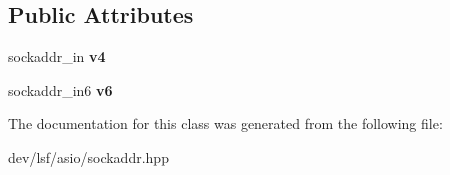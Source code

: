 \subsection*{Public Attributes}
\begin{DoxyCompactItemize}
\item 
\hypertarget{classlsf_1_1asio_1_1SockAddr_a4f9ff7f1fef58080776f0ea6a0032542}{
sockaddr\_\-in {\bfseries v4}}
\label{classlsf_1_1asio_1_1SockAddr_a4f9ff7f1fef58080776f0ea6a0032542}

\item 
\hypertarget{classlsf_1_1asio_1_1SockAddr_a3ee4827e60b045c116cba3b59f3944ec}{
sockaddr\_\-in6 {\bfseries v6}}
\label{classlsf_1_1asio_1_1SockAddr_a3ee4827e60b045c116cba3b59f3944ec}

\end{DoxyCompactItemize}


The documentation for this class was generated from the following file:\begin{DoxyCompactItemize}
\item 
dev/lsf/asio/sockaddr.hpp\end{DoxyCompactItemize}
